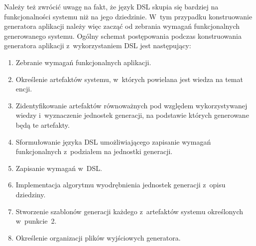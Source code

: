 Należy też zwrócić uwagę na fakt, że język DSL skupia się bardziej na funkcjonalności systemu niż na jego dziedzinie.
W~tym przypadku konstruowanie generatora aplikacji należy więc zacząć od zebrania wymagań funkcjonalnych generowanego systemu.
Ogólny schemat postępowania podczas konstruowania generatora aplikacji z~wykorzystaniem DSL jest następujący:

\begin{enumerate}
 \item Zebranie wymagań funkcjonalnych aplikacji.
 \item Określenie artefaktów systemu, w~których powielana jest wiedza na temat encji.
 \item Zidentyfikowanie artefaktów równoważnych pod względem wykorzystywanej wiedzy i~wyznaczenie jednostek generacji, na podstawie których generowane będą te artefakty.
 \item Sformułowanie języka DSL umożliwiającego zapisanie wymagań funkcjonalnych z~podziałem na jednostki generacji.
 \item Zapisanie wymagań w~DSL.
 \item Implementacja algorytmu wyodrębnienia jednostek generacji z~opisu dziedziny.
 \item Stworzenie szablonów generacji każdego z~artefaktów systemu określonych w~punkcie~2.
 \item Określenie organizacji plików wyjściowych generatora.
\end{enumerate}